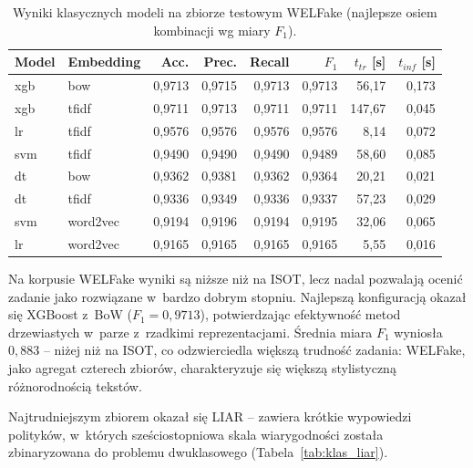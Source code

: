 \documentclass[oneside,polski,logo]{amuthesis}
\begin{document}
\begin{table}[ht]
\centering
\caption{Wyniki klasycznych modeli na zbiorze testowym WELFake
(najlepsze osiem kombinacji wg miary $F_1$).}
\label{tab:klas_welfake}
\begin{tabular}{llrrrrrr}
\toprule
Model & Embedding & Acc. & Prec. & Recall & $F_1$ & $t_{tr}$ [s] & $t_{inf}$ [s] \\
\midrule
xgb & bow      & 0,9713 & 0,9715 & 0,9713 & 0,9713 & 56,17  & 0,173 \\
xgb & tfidf    & 0,9711 & 0,9713 & 0,9711 & 0,9711 & 147,67 & 0,045 \\
lr  & tfidf    & 0,9576 & 0,9576 & 0,9576 & 0,9576 & 8,14   & 0,072 \\
svm & tfidf    & 0,9490 & 0,9490 & 0,9490 & 0,9489 & 58,60  & 0,085 \\
dt  & bow      & 0,9362 & 0,9381 & 0,9362 & 0,9364 & 20,21  & 0,021 \\
dt  & tfidf    & 0,9336 & 0,9349 & 0,9336 & 0,9337 & 57,23  & 0,029 \\
svm & word2vec & 0,9194 & 0,9196 & 0,9194 & 0,9195 & 32,06  & 0,065 \\
lr  & word2vec & 0,9165 & 0,9165 & 0,9165 & 0,9165 & 5,55   & 0,016 \\
\bottomrule
\end{tabular}
\end{table}

Na korpusie WELFake wyniki są niższe niż na ISOT, lecz nadal pozwalają
ocenić zadanie jako rozwiązane w~bardzo dobrym stopniu. Najlepszą
konfiguracją okazał się XGBoost z~BoW (\(F_1 = 0{,}9713\)), potwierdzając
efektywność metod drzewiastych w~parze z~rzadkimi reprezentacjami. Średnia
miara $F_1$ wyniosła \(0{,}883\) -- niżej niż na ISOT, co odzwierciedla
większą trudność zadania: WELFake, jako agregat czterech zbiorów,
charakteryzuje się większą stylistyczną różnorodnością tekstów.

Najtrudniejszym zbiorem okazał się LIAR -- zawiera krótkie wypowiedzi
polityków, w~których sześciostopniowa skala wiarygodności została
zbinaryzowana do problemu dwuklasowego (Tabela~\ref{tab:klas_liar}).
\end{document}
